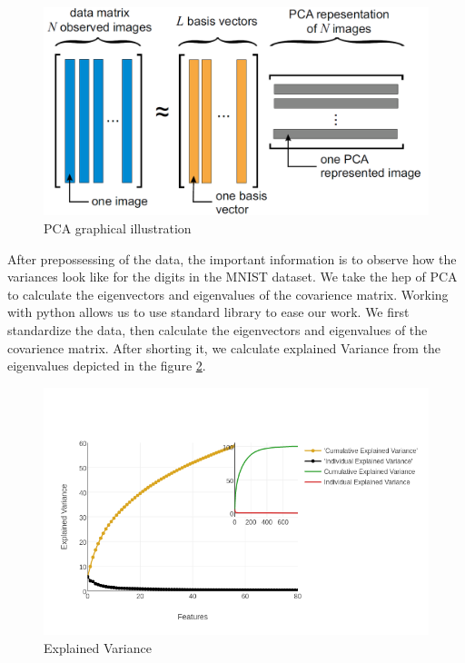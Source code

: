 \begin{figure}[h!]
\begin{center}
\includegraphics[width=\textwidth]{./Figures/4_pca.png}
\caption {PCA graphical illustration}
\label{s:4_pca} 
\end{center}
\end{figure}

After prepossessing of the data, the important information is to observe how the variances look like for the digits in the MNIST dataset. We take the hep of PCA to calculate the eigenvectors and eigenvalues of the covarience matrix. Working with python allows us to use standard library  to ease our work. We first standardize the data, then calculate the eigenvectors and eigenvalues of the covarience matrix. After shorting it, we calculate  explained Variance from the eigenvalues depicted in the figure \ref{pca_var}.

\begin{figure}[h!]
\begin{center}
\includegraphics[width=\textwidth]{./Figures/pca_var.png}
\caption {Explained Variance}
\label{pca_var} 
\end{center}
\end{figure}

